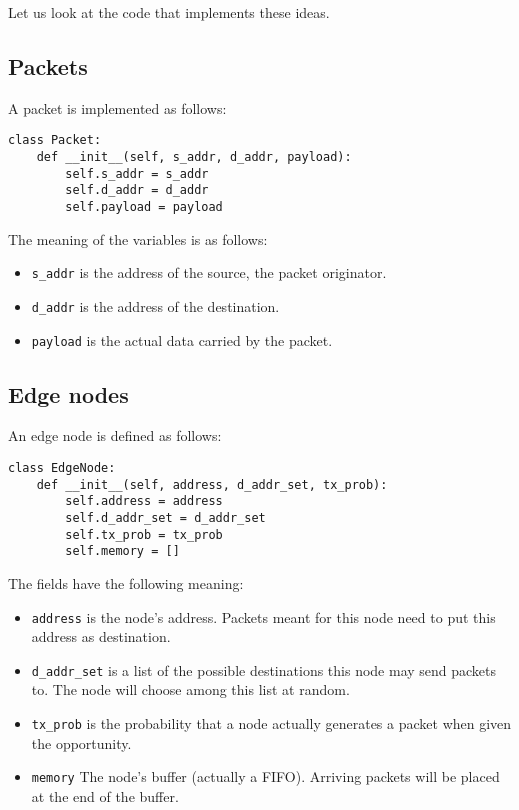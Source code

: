 \documentclass[11pt]{report}
\begin{document}
Let us look at the code that implements these ideas.

\subsection*{Packets}

A packet is implemented as follows:

\begin{verbatim}
class Packet:
    def __init__(self, s_addr, d_addr, payload):
        self.s_addr = s_addr
        self.d_addr = d_addr
        self.payload = payload
\end{verbatim}

The meaning of the variables is as follows:
\begin{itemize}
	\item \texttt{s_addr} is the address of the source, the packet originator.
	\item \texttt{d_addr} is the address of the destination.
	\item \texttt{payload} is the actual data carried by the
		packet.
\end{itemize}

\subsection*{Edge nodes}

An edge node is defined as follows:
\begin{verbatim}
class EdgeNode:
    def __init__(self, address, d_addr_set, tx_prob):
        self.address = address
        self.d_addr_set = d_addr_set
        self.tx_prob = tx_prob
        self.memory = []
\end{verbatim}

The fields have the following meaning:
\begin{itemize}
	\item \texttt{address} is the node's address. Packets meant for
		this node need to put this address as destination.
	\item \texttt{d_addr_set} is a list of the possible
		destinations this node may send packets to. The node will choose among
		this list at random.
	\item \texttt{tx_prob} is the probability that a node actually
		generates a packet when given the opportunity.
	\item \texttt{memory} The node's buffer (actually a FIFO).
		Arriving packets will be placed at the end of the buffer.
\end{itemize}
\end{document}
